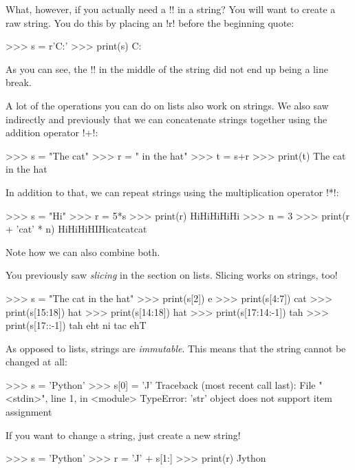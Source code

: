 \documentclass[11pt]{cselabheader}
\begin{document}
What, however, if you actually need a \pythoninline!\n! in a string? You will want
to create a raw string. You do this by placing an \pythoninline!r! before the
beginning quote:

\begin{pyconcode}
>>> s = r'C:\Users\Files\nothing\more'
>>> print(s)
C:\Users\Files\nothing\more
\end{pyconcode}

As you can see, the \pythoninline!\n! in the middle of the string did not end up
being a line break.

A lot of the operations you can do on lists also work on strings. We also saw
indirectly and previously that we can concatenate strings together using the
addition operator \pythoninline!+!:

\begin{pyconcode}
>>> s = "The cat"
>>> r = " in the hat"
>>> t = s+r
>>> print(t)
The cat in the hat
\end{pyconcode}

In addition to that, we can repeat strings using the multiplication operator
\pythoninline!*!:

\begin{pyconcode}
>>> s = "Hi"
>>> r = 5*s
>>> print(r)
HiHiHiHiHi
>>> n = 3
>>> print(r + 'cat' * n)
HiHiHiHIHicatcatcat
\end{pyconcode}

Note how we can also combine both.

You previously saw \emph{slicing} in the section on lists. Slicing works on strings, too!

\begin{pyconcode}
>>> s = "The cat in the hat"
>>> print(s[2])
e
>>> print(s[4:7])
cat
>>> print(s[15:18])
hat
>>> print(s[14:18])
 hat
>>> print(s[17:14:-1])
tah
>>> print(s[17::-1])
tah eht ni tac ehT
\end{pyconcode}

As opposed to lists, strings are \emph{immutable}. This means that the string
cannot be changed at all:

\begin{pyconcode}
>>> s = 'Python'
>>> s[0] = 'J'
Traceback (most recent call last):
  File "<stdin>", line 1, in <module>
  TypeError: 'str' object does not support item assignment
\end{pyconcode}

If you want to change a string, just create a new string!

\begin{pyconcode}
>>> s = 'Python'
>>> r = 'J' + s[1:]
>>> print(r)
Jython
\end{pyconcode}
\end{document}
